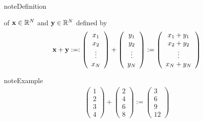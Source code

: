 \documentclass[letterpaper,10pt,english]{jupyterBook}
\begin{document}
\begin{sphinxadmonition}{note}{Definition}

\sphinxAtStartPar
{} of \({\bf x} \in \mathbb{R}^N\) and \({\bf y} \in \mathbb{R}^N\) defined by
\begin{equation*}
\begin{split}
%
{\bf x} + {\bf y} 
:=: 
\left(
\begin{array}{c}
x_1 \\
x_2 \\
\vdots \\
x_N
\end{array}
\right)
+
\left(
\begin{array}{c}
y_1 \\
y_2 \\
\vdots \\
y_N
\end{array}
\right)
:=
\left(
\begin{array}{c}
x_1 + y_1 \\
x_2 + y_2 \\
\vdots \\
x_N + y_N
\end{array}
\right)
%
\end{split}
\end{equation*}\end{sphinxadmonition}

\begin{sphinxadmonition}{note}{Example}
\begin{equation*}
\begin{split}
%
\left(
\begin{array}{c}
1 \\
2 \\
3 \\
4
\end{array}
\right)
+
\left(
\begin{array}{c}
2 \\
4 \\
6 \\
8
\end{array}
\right)
:=
\left(
\begin{array}{c}
3 \\
6 \\
9 \\
12
\end{array}
\right)
%
\end{split}
\end{equation*}\end{sphinxadmonition}
\end{document}
